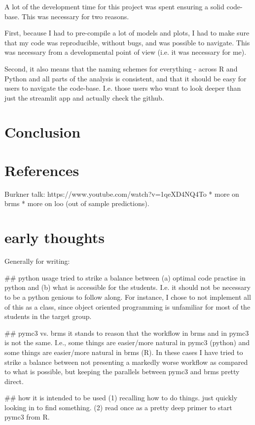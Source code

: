 \documentclass[12pt]{article}
\begin{document}
A lot of the development time for this project was spent ensuring a
solid code-base. This was necessary for two reasons.

First, because I had to pre-compile a lot of models and plots,
I had to make sure that my code was reproducible, without bugs,
and was possible to navigate. This was necessary from a developmental
point of view (i.e. it was necessary for me).

Second, it also means that the naming schemes for everything -
across R and Python and all parts of the analysis is consistent,
and that it should be easy for users to navigate the code-base.
I.e. those users who want to look deeper than just the streamlit app
and actually check the github.

\section{Conclusion}

\section{References}

Burkner talk: https://www.youtube.com/watch?v=1qeXD4NQ4To
* more on brms
* more on loo (out of sample predictions).

\section{early thoughts}
Generally for writing:

## python usage
tried to strike a balance between (a) optimal code practise
in python and (b) what is accessible for the students.
I.e. it should not be necessary to be a python genious to follow along.
For instance, I chose to not implement all of this as a class,
since object oriented programming is unfamiliar for most of
the students in the target group.

## pymc3 vs. brms
it stands to reason that the workflow in brms and in pymc3
is not the same. I.e., some things are easier/more natural in pymc3 (python) and
some things are easier/more natural in brms (R).
In these cases I have tried to strike a balance between not presenting
a markedly worse workflow as compared to what is possible, but keeping
the parallels between pymc3 and brms pretty direct.

## how it is intended to be used
(1) recalling how to do things. just quickly looking in to find something.
(2) read once as a pretty deep primer to start pymc3 from R.
\end{document}
